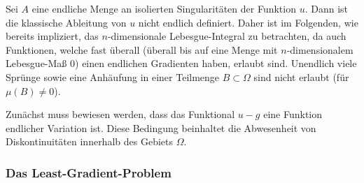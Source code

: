 \begin{Anmerkung}
    Sei $A$ eine endliche Menge an isolierten Singularitäten der Funktion $u$. Dann ist die klassische Ableitung von $u$ nicht endlich definiert. Daher ist im Folgenden, wie bereits impliziert, das $n$-dimensionale Lebesgue-Integral zu betrachten, da auch Funktionen, welche fast überall (überall bis auf eine Menge mit $n$-dimensionalem Lebesgue-Maß 0) einen endlichen Gradienten haben, erlaubt sind. Unendlich viele Sprünge sowie eine Anhäufung in einer Teilmenge $B\subset \Omega$ sind nicht erlaubt (für $\mu(B)\neq 0$).
\end{Anmerkung}
Zunächst muss bewiesen werden, dass das Funktional $u-g$ eine Funktion endlicher Variation ist. Diese Bedingung beinhaltet die Abwesenheit von Diskontinuitäten innerhalb des Gebiets $\Omega$. 


\subsubsection{Das Least-Gradient-Problem}

